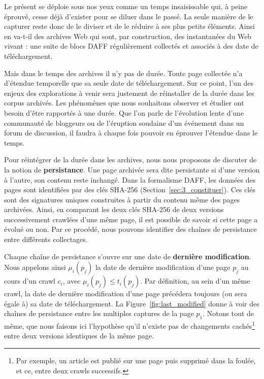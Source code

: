 \documentclass[symmetric,justified,marginals=raggedouter]{tufte-book}
\begin{document}
\noindent Le présent se déploie sous nos yeux comme un temps insaisissable qui, à peine éprouvé, cesse déjà d'exister pour se diluer dans le passé. La seule manière de le capturer reste donc de le diviser et de le réduire à ses plus petits éléments. Ainsi en va-t-il des archives Web qui sont, par construction, des instantanées du Web vivant : une suite de blocs DAFF régulièrement collectés et associés à des date de téléchargement. 

Mais dans le temps des archives il n'y pas de durée. Toute page collectée n'a d'étendue temporelle que sa seule date de téléchargement. Sur ce point, l'un des enjeux des explorations à venir sera justement de réinstaller de la durée dans les corpus archivés. Les phénomènes que nous souhaitons observer et étudier ont besoin d'être rapportés à une durée. Que l'on parle de l'évolution lente d'une communauté de bloggeurs ou de l'éruption soudaine d'un événement dans un forum de discussion, il faudra à chaque fois pouvoir en éprouver l'étendue dans le temps. 

Pour réintégrer de la durée dans les archives, nous nous proposons de discuter de la notion de \textbf{persistance}. Une page archivée sera dite persistante si d'une version à l'autre, son contenu reste inchangé. Dans la formalisme DAFF, les données des pages sont identifiées par des clés SHA-256 (Section~\ref{sec:3_constituer}). Ces clés sont des signatures uniques construites à partir du contenu même des pages archivées. Ainsi, en comparant les deux clés SHA-256 de deux versions successivement crawlées d'une même page, il est possible de savoir si cette page a évolué ou non. Par ce procédé, nous pouvons identifier des chaînes de persistance entre différents collectages.

Chaque chaîne de persistance s'ouvre sur une date de \textbf{dernière modification}. Nous appelons ainsi $\mu_i(p_j)$ la date de dernière modification d'une page $p_j$ au cours d'un crawl $c_i$, avec $\mu_i(p_j) \leq t_i(p_j)$. Par définition, au sein d'un même crawl, la date de dernière modification d'une page précédera toujours (ou sera égale à) sa date de téléchargement. La Figure~\ref{fig:last_modified} donne à voir des chaînes de persistance entre les multiples captures de la page $p_1$. Notons tout de même, que nous faisons ici l'hypothèse qu'il n'existe pas de changements cachés\footnote{\RaggedOuter Par exemple, un article est publié sur une page puis supprimé dans la foulée, et ce, entre deux crawls successifs.} entre deux versions identiques de la même page.
\end{document}
